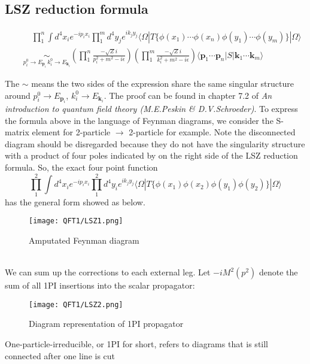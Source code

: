 \documentclass[cyan]{elegantnote}
\begin{document}
\subsection{LSZ reduction formula}
\begin{newthem}
\begin{eqnarray}
&& \quad \prod_1^n \int d^4 x_i e^{-ip_ix_i} \prod_1^m d^4 y_j e^{ik_jy_j} \langle \Omega | T \{\phi(x_1) \cdots \phi(x_n) \phi(y_1) \cdots \phi(y_m)\} | \Omega \rangle \nonumber \\
&& \underset{ p_i^0 \to E_{\bm{p}_i}\, k_i^0 \to E_{\bm{k}_i}}{\sim}  \left( \prod_1^n \frac{-\sqrt{Z} i}{p_i^2 + m^2 -i\epsilon} \right) \left( \prod_1^m \frac{-\sqrt{Z} i}{k_i^2 + m^2 -i\epsilon} \right) \langle \bm{p}_1 \cdots \bm{p}_n | S | \bm{k}_1 \cdots \bm{k}_m \rangle \nonumber
\end{eqnarray}
\end{newthem}
\noindent
The $\sim$ means the two sides of the expression share the same singular structure around $p_i^0 \to E_{\bm{p}_i}$, $k_i^0 \to E_{\bm{k}_i}$.
The proof can be found in chapter 7.2 of \emph{An introduction to quantum field theory (M.E.Peskin \& D.V.Schroeder)}.
To express the formula above in the language of Feynman diagrams, we consider the S-matrix element for 2-particle $\to$ 2-particle for example. Note the disconnected diagram should be disregarded because they do not have the singularity structure with a product of four poles indicated by on the right side of the LSZ reduction formula. So, the exact four point function
\[\prod_1^2 \int d^4 x_i e^{-ip_ix_i} \prod_1^2 d^4 y_i e^{ik_jy_j} \langle \Omega | T \{\phi(x_1)\phi(x_2)\phi(y_1) \phi(y_2)\} | \Omega \rangle \]
has the general form showed as below.
\begin{figure}[!h]
\centering
\texttt{[image: QFT1/LSZ1.png]}
\caption{Amputated Feynman diagram}
\end{figure}\\
We can sum up the corrections to each external leg. Let $-iM^2(p^2)$ denote the sum of all 1PI insertions into the scalar propagator:
\begin{figure}[!h]
\centering
\texttt{[image: QFT1/LSZ2.png]}
\caption{Diagram representation of 1PI propagator}
\end{figure}
\begin{note}
One-particle-irreducible, or 1PI for short, refers to diagrams that is still connected after one line is cut
\end{note}
\end{document}
